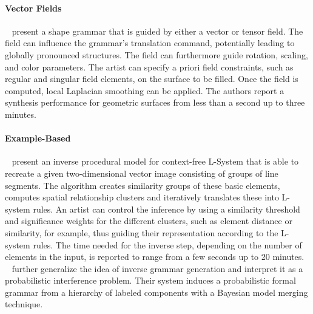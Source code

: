 \paragraph*{Vector Fields}
\label{para:analysis_rulebased_vector_fields}

\citeauthor*{yuanyuan_2011_gso}~\cite{yuanyuan_2011_gso} present a shape grammar that is guided by either a vector or tensor field. The field can influence the grammar's translation command, potentially leading to globally pronounced structures. The field can furthermore guide rotation, scaling, and color parameters. The artist can specify a priori field constraints, such as regular and singular field elements, on the surface to be filled. Once the field is computed, local Laplacian smoothing can be applied. The authors report a synthesis performance for geometric surfaces from less than a second up to three minutes.
\paragraph*{Example-Based}
\label{para:analysis_rulebased_example}
\citeauthor*{stava_2010_ipm}~\cite{stava_2010_ipm} present an inverse procedural model for context-free L-System that is able to recreate a given two-dimensional vector image consisting of groups of line segments. The algorithm creates similarity groups of these basic elements, computes spatial relationship clusters and iteratively translates these into L-system rules. An artist can control the inference by using a similarity threshold and significance weights for the different clusters, such as element distance or similarity, for example, thus guiding their representation according to the L-system rules. The time needed for the inverse step, depending on the number of elements in the input, is reported to range from a few seconds up to 20 minutes. \citeauthor*{talton_2012_ldp}~\cite{talton_2012_ldp} further generalize the idea of inverse grammar generation and interpret it as a probabilistic interference problem. Their system induces a probabilistic formal grammar from a hierarchy of labeled components with a Bayesian model merging technique.


